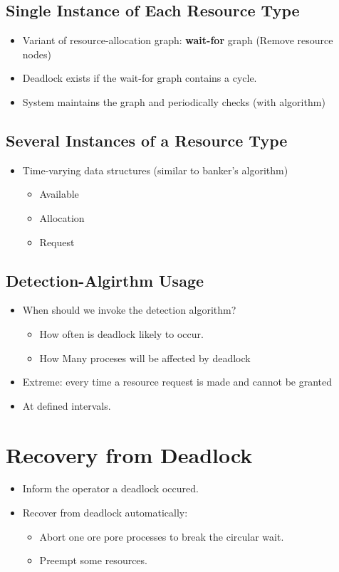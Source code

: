 \documentclass[10pt]{report}
\begin{document}
		\subsection{Single Instance of Each Resource Type}
			\begin{itemize}
				\item Variant of resource-allocation graph: \textbf{wait-for} graph (Remove resource nodes)
				\item Deadlock exists if the wait-for graph contains a cycle.
				\item System maintains the graph and periodically checks (with algorithm)
			\end{itemize}

		\subsection{Several Instances of a Resource Type}
			\begin{itemize}
				\item Time-varying data structures (similar to banker's algorithm)
				\begin{itemize}
					\item Available
					\item Allocation
					\item Request
				\end{itemize}
			\end{itemize}

		\subsection{Detection-Algirthm Usage}
			\begin{itemize}
				\item When should we invoke the detection algorithm?
				\begin{itemize}
					\item How often is deadlock likely to occur.
					\item How Many proceses will be affected by deadlock
				\end{itemize}
				\item Extreme: every time a resource request is made and cannot be granted
				\item At defined intervals.
			\end{itemize}

	\section{Recovery from Deadlock}
		\begin{itemize}
			\item Inform the operator a deadlock occured.
			\item Recover from deadlock automatically:
			\begin{itemize}
				\item Abort one ore pore processes to break the circular wait.
				\item Preempt some resources.
			\end{itemize}
		\end{itemize}
\end{document}
